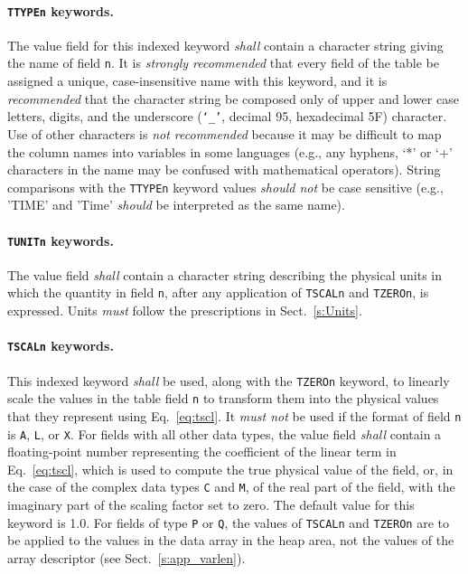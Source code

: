 \documentclass[onecolumn]{aa}
\begin{document}
   \paragraph{{\tt TTYPEn} keywords.} 
 The value field for this indexed keyword {\em shall} contain a
 character string giving the name of field {\tt n}.  
 It is {\em strongly recommended} that every field of the table be 
 assigned a unique, case-insensitive  name with this keyword, and it is 
 {\em recommended} that the character string be composed only of upper and 
 lower case letters, digits,  and the underscore ({\tt `\_'}, decimal 95, 
 hexadecimal 5F) character.  Use of other characters is {\em not recommended} 
 because it may be difficult to map the column names into variables in some
 languages (e.g., any hyphens, `*'  or `+' characters in the name may be confused
 with mathematical operators).
 String comparisons with the {\tt TTYPEn} keyword values {\em should not}
 be case sensitive (e.g., 'TIME' and 'Time' {\em should} be interpreted as the 
 same name).
 
   \paragraph{{\tt TUNITn} keywords.}
 The value field {\em shall} contain a character 
 string describing the physical units 
 in which the quantity in field 
 {\tt n}, after any application of {\tt TSCALn}
 and {\tt TZEROn}, is expressed.  Units {\em must} follow the 
 prescriptions in Sect.\ \ref{s:Units}.       

   \paragraph{{\tt TSCALn} keywords.}
 This indexed keyword {\em shall} be used, along with the {\tt TZEROn}
 keyword, to linearly scale the values in the table field {\tt n}
 to transform them into the physical values that they
 represent using Eq.~\ref{eq:tscl}.
 It {\em must not} be used  if the format of field 
 {\tt n} is {\tt A}, {\tt L}, or {\tt X}. 
 For fields with all other data types, the
 value field {\em shall} contain a floating-point number representing the
 coefficient of the linear term in Eq.~\ref{eq:tscl}, which is used   
 to compute the true physical value of the field, or,
 in the case of the complex  data types {\tt C} and 
 {\tt M}, of the real part of the
 field, with the imaginary part of the scaling factor set to zero.  The 
 default value for this keyword is 1.0. 
  For fields  of type {\tt P} or {\tt Q},
the values of {\tt TSCALn} and {\tt TZEROn}
are to be applied to the values in the
data array in the heap  area, not the values of the array descriptor
(see Sect.\ \ref{s:app_varlen}).
\end{document}
